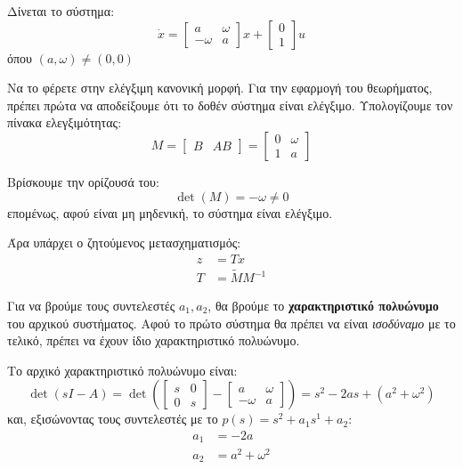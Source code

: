 \documentclass[11pt,a4paper,notitlepage,fleqn]{article}
\let\mytodo\todo
\renewcommand{\todo}[1]{\par\mytodo[inline,noline]{#1}}
\begin{document}
\begin{exercise}[Παράδειγμα]
	Δίνεται το σύστημα: \[
	\dot x = \left[\begin{matrix}
	a & \omega \\ -\omega &  a
	\end{matrix}\right]x + \left[\begin{matrix}
	0 \\ 1
	\end{matrix}\right]u
	\] όπου \( (a,\omega ) \neq (0,0) \)
	
	Να το φέρετε στην ελέγξιμη κανονική μορφή.
	\tcblower
	Για την εφαρμογή του θεωρήματος, πρέπει πρώτα να αποδείξουμε ότι το
	δοθέν σύστημα είναι ελέγξιμο.
	Υπολογίζουμε τον πίνακα ελεγξιμότητας:
	\[
	M=\left[\begin{matrix}
	B & AB
	\end{matrix}\right] = \left[\begin{matrix}
	0 & \omega \\ 1 & a
	\end{matrix}\right]
	\]
	
	Βρίσκουμε την ορίζουσά του:
	\[
	\det(M) = -\omega  \neq 0
	\]
	επομένως, αφού είναι μη μηδενική, το σύστημα είναι ελέγξιμο.
	\todo{really?}
	
	Άρα υπάρχει ο ζητούμενος μετασχηματισμός:
	\begin{align*}
		z &= Tx \\
		T &= \tilde M M^{-1}
	\end{align*}
	
	Για να βρούμε τους συντελεστές \( a_1, a_2 \), θα βρούμε το
	\textbf{χαρακτηριστικό πολυώνυμο} του αρχικού συστήματος. Αφού το πρώτο
	σύστημα θα πρέπει να είναι \textit{ισοδύναμο} με το τελικό, πρέπει
	να έχουν ίδιο χαρακτηριστικό πολυώνυμο.
	
	Το αρχικό χαρακτηριστικό πολυώνυμο είναι:
	\[
	\det(sI-A) = \det\left(
	\left[\begin{matrix}
	s & 0 \\ 0 & s
	\end{matrix}\right]-\left[\begin{matrix}
	a & \omega  \\ -\omega &a
	\end{matrix}\right]
	\right) = s^2-2as + (a^2+\omega^2)
	\]
	και, εξισώνοντας τους συντελεστές με το \( p(s) = s^2 + a_1s^1 + a_2 \):
	\begin{align*}
		a_1 &= -2a \\
		a_2 &= a^2+\omega^2
	\end{align*}
	

\end{exercise}
\end{document}
